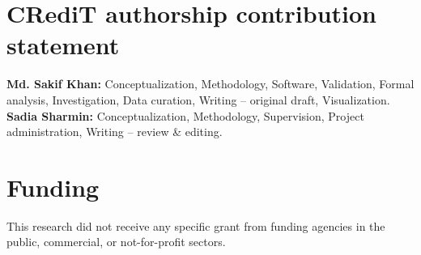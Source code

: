 \documentclass[preprint,review,12pt]{elsarticle}
\begin{document}
%
%

%
%
\section*{CRediT authorship contribution statement}
\textbf{Md. Sakif Khan:} Conceptualization, Methodology, Software,
Validation, Formal analysis, Investigation, Data curation, Writing --
original draft, Visualization. \textbf{Sadia Sharmin:}
Conceptualization, Methodology, Supervision, Project administration,
Writing -- review \& editing.

\section*{Funding}
This research did not receive any specific grant from funding agencies
in the public, commercial, or not-for-profit sectors.
\end{document}
